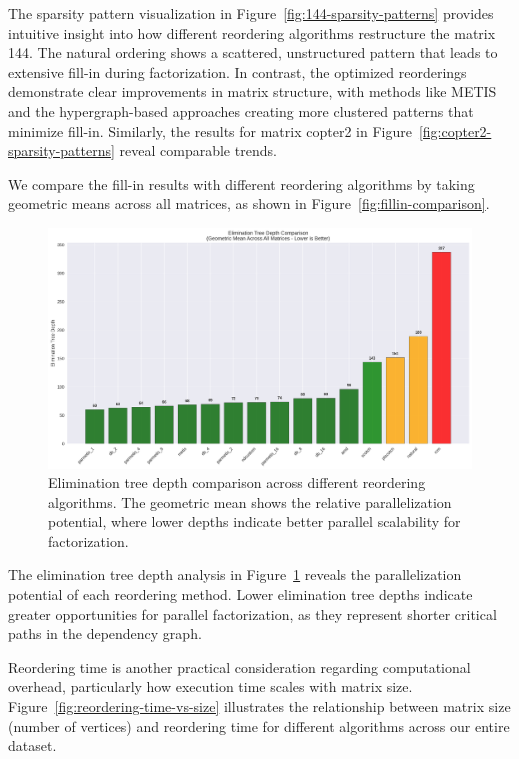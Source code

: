 The sparsity pattern visualization in Figure~\ref{fig:144-sparsity-patterns} provides intuitive insight into how different reordering algorithms restructure the matrix 144. The natural ordering shows a scattered, unstructured pattern that leads to extensive fill-in during factorization. In contrast, the optimized reorderings demonstrate clear improvements in matrix structure, with methods like METIS and the hypergraph-based approaches creating more clustered patterns that minimize fill-in. Similarly, the results for matrix copter2 in Figure~\ref{fig:copter2-sparsity-patterns} reveal comparable trends.

We compare the fill-in results with different reordering algorithms by taking geometric means across all matrices, as shown in Figure~\ref{fig:fillin-comparison}. 


\begin{figure}[h]
\centering
\includegraphics[width=\textwidth]{fig/res/elimination_tree_depth_comparison.png}
\caption{Elimination tree depth comparison across different reordering algorithms. The geometric mean shows the relative parallelization potential, where lower depths indicate better parallel scalability for factorization.}
\label{fig:elimination-tree-depth}
\end{figure}

The elimination tree depth analysis in Figure~\ref{fig:elimination-tree-depth} reveals the parallelization potential of each reordering method. Lower elimination tree depths indicate greater opportunities for parallel factorization, as they represent shorter critical paths in the dependency graph. 

Reordering time is another practical consideration regarding computational overhead, particularly how execution time scales with matrix size. Figure~\ref{fig:reordering-time-vs-size} illustrates the relationship between matrix size (number of vertices) and reordering time for different algorithms across our entire dataset.

